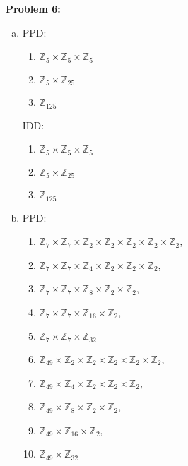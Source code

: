 \documentclass[12pt, letterpaper]{article}
\newenvironment{problem}
    [1]
    {\noindent \textbf{Problem #1:}}
    {\vspace{3mm}}
\begin{document}
\begin{problem}{6}
\begin{enumerate}[(a)]
        \item PPD:
        \begin{enumerate}[1.]
            \item $\mathbb{Z}_5 \times \mathbb{Z}_5 \times \mathbb{Z}_5$
            \item $\mathbb{Z}_5 \times \mathbb{Z}_{25}$
            \item $\mathbb{Z}_{125}$
        \end{enumerate}
        
        IDD:
        \begin{enumerate}[1.]
            \item $\mathbb{Z}_5 \times \mathbb{Z}_5 \times \mathbb{Z}_5$
            \item $\mathbb{Z}_5 \times \mathbb{Z}_{25}$
            \item $\mathbb{Z}_{125}$
        \end{enumerate}

        \item PPD:
        \begin{enumerate}[1.]
            \item $\mathbb{Z}_7 \times \mathbb{Z}_7 \times \mathbb{Z}_2 \times \mathbb{Z}_2 
                \times \mathbb{Z}_2 \times \mathbb{Z}_2 \times \mathbb{Z}_2$,
            \item $\mathbb{Z}_7 \times \mathbb{Z}_7 \times \mathbb{Z}_4 \times \mathbb{Z}_2 
                \times \mathbb{Z}_2 \times \mathbb{Z}_2$,
            \item $\mathbb{Z}_7 \times \mathbb{Z}_7 \times \mathbb{Z}_8 \times \mathbb{Z}_2 
                \times \mathbb{Z}_2$,
            \item $\mathbb{Z}_7 \times \mathbb{Z}_7 \times \mathbb{Z}_{16} \times \mathbb{Z}_2$,
            \item $\mathbb{Z}_7 \times \mathbb{Z}_7 \times \mathbb{Z}_{32}$
            
            \item $\mathbb{Z}_{49} \times \mathbb{Z}_2 \times \mathbb{Z}_2 
                \times \mathbb{Z}_2 \times \mathbb{Z}_2 \times \mathbb{Z}_2$,
            \item $\mathbb{Z}_{49} \times \mathbb{Z}_4 \times \mathbb{Z}_2 
                \times \mathbb{Z}_2 \times \mathbb{Z}_2$,
            \item $\mathbb{Z}_{49} \times \mathbb{Z}_8 \times \mathbb{Z}_2 
                \times \mathbb{Z}_2$,
            \item $\mathbb{Z}_{49} \times \mathbb{Z}_{16} \times \mathbb{Z}_2$,
            \item $\mathbb{Z}_{49} \times \mathbb{Z}_{32}$
        \end{enumerate}
        

\end{enumerate}
\end{problem}
\end{document}
